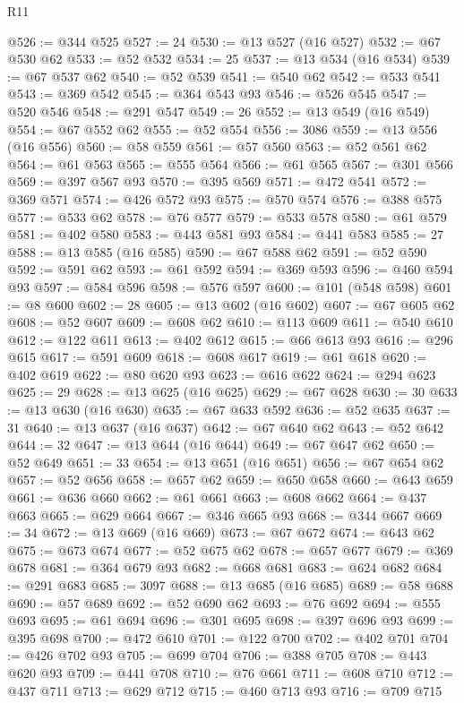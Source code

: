 \begin{lexlean}{R11}
\begin{coremodule}
@526 := @344 @525
@527 := 24
@530 := @13 @527 (@16 @527)
@532 := @67 @530 @62
@533 := @52 @532
@534 := 25
@537 := @13 @534 (@16 @534)
@539 := @67 @537 @62
@540 := @52 @539
@541 := @540 @62
@542 := @533 @541
@543 := @369 @542
@545 := @364 @543 @93
@546 := @526 @545
@547 := @520 @546
@548 := @291 @547
@549 := 26
@552 := @13 @549 (@16 @549)
@554 := @67 @552 @62
@555 := @52 @554
@556 := 3086
@559 := @13 @556 (@16 @556)
@560 := @58 @559
@561 := @57 @560
@563 := @52 @561 @62
@564 := @61 @563
@565 := @555 @564
@566 := @61 @565
@567 := @301 @566
@569 := @397 @567 @93
@570 := @395 @569
@571 := @472 @541
@572 := @369 @571
@574 := @426 @572 @93
@575 := @570 @574
@576 := @388 @575
@577 := @533 @62
@578 := @76 @577
@579 := @533 @578
@580 := @61 @579
@581 := @402 @580
@583 := @443 @581 @93
@584 := @441 @583
@585 := 27
@588 := @13 @585 (@16 @585)
@590 := @67 @588 @62
@591 := @52 @590
@592 := @591 @62
@593 := @61 @592
@594 := @369 @593
@596 := @460 @594 @93
@597 := @584 @596
@598 := @576 @597
@600 := @101 (@548 @598)
@601 := @8 @600
@602 := 28
@605 := @13 @602 (@16 @602)
@607 := @67 @605 @62
@608 := @52 @607
@609 := @608 @62
@610 := @113 @609
@611 := @540 @610
@612 := @122 @611
@613 := @402 @612
@615 := @66 @613 @93
@616 := @296 @615
@617 := @591 @609
@618 := @608 @617
@619 := @61 @618
@620 := @402 @619
@622 := @80 @620 @93
@623 := @616 @622
@624 := @294 @623
@625 := 29
@628 := @13 @625 (@16 @625)
@629 := @67 @628
@630 := 30
@633 := @13 @630 (@16 @630)
@635 := @67 @633 @592
@636 := @52 @635
@637 := 31
@640 := @13 @637 (@16 @637)
@642 := @67 @640 @62
@643 := @52 @642
@644 := 32
@647 := @13 @644 (@16 @644)
@649 := @67 @647 @62
@650 := @52 @649
@651 := 33
@654 := @13 @651 (@16 @651)
@656 := @67 @654 @62
@657 := @52 @656
@658 := @657 @62
@659 := @650 @658
@660 := @643 @659
@661 := @636 @660
@662 := @61 @661
@663 := @608 @662
@664 := @437 @663
@665 := @629 @664
@667 := @346 @665 @93
@668 := @344 @667
@669 := 34
@672 := @13 @669 (@16 @669)
@673 := @67 @672
@674 := @643 @62
@675 := @673 @674
@677 := @52 @675 @62
@678 := @657 @677
@679 := @369 @678
@681 := @364 @679 @93
@682 := @668 @681
@683 := @624 @682
@684 := @291 @683
@685 := 3097
@688 := @13 @685 (@16 @685)
@689 := @58 @688
@690 := @57 @689
@692 := @52 @690 @62
@693 := @76 @692
@694 := @555 @693
@695 := @61 @694
@696 := @301 @695
@698 := @397 @696 @93
@699 := @395 @698
@700 := @472 @610
@701 := @122 @700
@702 := @402 @701
@704 := @426 @702 @93
@705 := @699 @704
@706 := @388 @705
@708 := @443 @620 @93
@709 := @441 @708
@710 := @76 @661
@711 := @608 @710
@712 := @437 @711
@713 := @629 @712
@715 := @460 @713 @93
@716 := @709 @715

\end{coremodule}
\end{lexlean}
